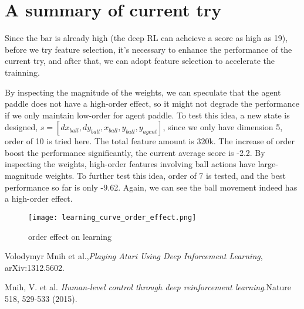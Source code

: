 \documentclass[12pt]{article}
\begin{document}
\section{A summary of current try}
Since the bar is already high (the deep RL can acheieve a score as
high as 19), before we try feature selection, it's necessary to
enhance the performance of the current try, and after that, we can
adopt feature selection to accelerate the trainning. 

By inspecting the magnitude of the weights, we can speculate that the agent
paddle does not have a high\--order effect, so it might not degrade
the performance if we only maintain low\--order for agent paddle. To
test this idea, a new state is designed, $s=[dx_{ball}, dy_{ball}, x_{ball},
y_{ball}, y_{agent}]$, since we only have dimension 5, order of 10 is
tried here. The total feature amount is 320k. The increase of order
boost the performance significantly, the current average score is
-2.2. By inspecting the weights, high\--order features involving ball
actions have large\--magnitude weights. To further test this idea,
order of 7 is tested, and the best performance so far is only -9.62. 
Again, we can see the ball movement indeed has a high\--order effect.
\begin{figure}[h!]
\centering
\texttt{[image: learning\_curve\_order\_effect.png]}
\caption{order effect on learning}
\end{figure}

\begin{thebibliography}{9}
        Volodymyr Mnih et al.,\textit{Playing Atari Using Deep
        Inforcement Learning},  arXiv:1312.5602.

                Mnih, V. et al. \textit{Human-level control through
                deep reinforcement learning}.Nature 518, 529-533 (2015).
\end{thebibliography}
\end{document}
